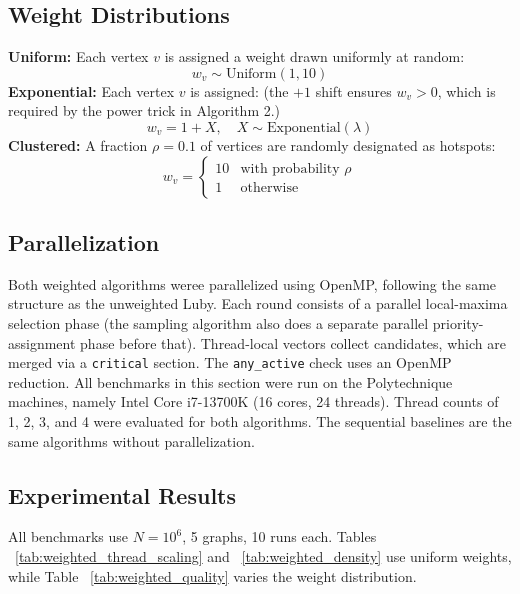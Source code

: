 \documentclass{article}
\begin{document}
\subsection{Weight Distributions}

\textbf{Uniform:} Each vertex $v$ is assigned a weight drawn uniformly at random:
\begin{equation}
  w_v \sim \text{Uniform}(1, 10)
\end{equation}
\textbf{Exponential:} Each vertex $v$ is assigned: (the $+1$ shift ensures $w_v > 0$, which is required by the power trick in Algorithm 2.)
\begin{equation}
  w_v = 1 + X, \quad X \sim \text{Exponential}(\lambda)
\end{equation}
\textbf{Clustered:} A fraction $\rho = 0.1$ of vertices are randomly designated as hotspots:
\begin{equation}
  w_v = \begin{cases} 10 & \text{with probability } \rho \\ 1 & \text{otherwise} \end{cases}
\end{equation}

\subsection{Parallelization}

Both weighted algorithms weree parallelized using OpenMP, following the same structure as the unweighted Luby. Each round consists of a parallel local-maxima selection phase (the sampling algorithm also does a separate parallel priority-assignment phase before that). Thread-local vectors collect candidates, which are merged via a \texttt{critical} section. The \texttt{any\_active} check uses an OpenMP reduction. All benchmarks in this section were run on the Polytechnique machines, namely Intel Core i7-13700K (16 cores, 24 threads). Thread counts of 1, 2, 3, and 4 were evaluated for both algorithms. The sequential baselines are the same algorithms without parallelization.

\subsection{Experimental Results}

All benchmarks use $N=10^6$, 5 graphs, 10 runs each. Tables ~\ref{tab:weighted_thread_scaling} and ~\ref{tab:weighted_density} use uniform weights, while Table ~\ref{tab:weighted_quality} varies the weight distribution.
\end{document}
